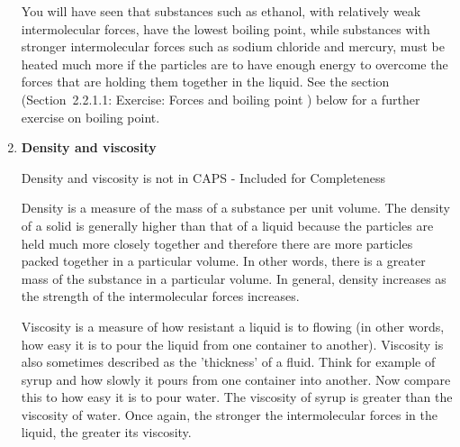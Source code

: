 \begin{enumerate}[noitemsep, label=\textbf{\arabic*}. ]
    \par
You will have seen that substances such as ethanol, with relatively weak 
intermolecular forces, have the lowest boiling point, while substances with 
stronger intermolecular forces such as sodium chloride and mercury, must be 
heated much more if the particles are to have enough energy to overcome the 
forces that are holding them together in the liquid. See the section (Section~2.2.1.1: Exercise: Forces and boiling point ) below for a further exercise on boiling point. 
\label{m38734*uid973}\item \textbf{Density and viscosity}\label{m38734*eip-726}
\par Density and viscosity is not in CAPS - Included for Completeness
	\par
 { \label{m38734*meaningfhsstid83}Density is a measure of the mass of a substance per 
unit volume. } 
The density of a solid is generally higher than that of a liquid because the particles are held much more closely together and therefore there 
are more particles packed together in a particular volume. In other words, there is a greater mass of the substance in a particular volume. In general, density increases as the strength of the intermolecular forces increases. \vspace{\rubberspace}\par
 { \label{m38734*meaningfhsstid84}Viscosity is a measure of how resistant a liquid is to 
flowing (in other words, how easy it is to pour the liquid from one container to 
another). } 
 Viscosity is also sometimes described as the 'thickness' of a fluid. 
Think for example of syrup and how slowly it pours from one container into 
another. Now compare this to how easy it is to pour water. The viscosity of 
syrup is greater than the viscosity of water. Once again, the stronger the 
intermolecular forces in the liquid, the greater its viscosity.
\end{enumerate}
